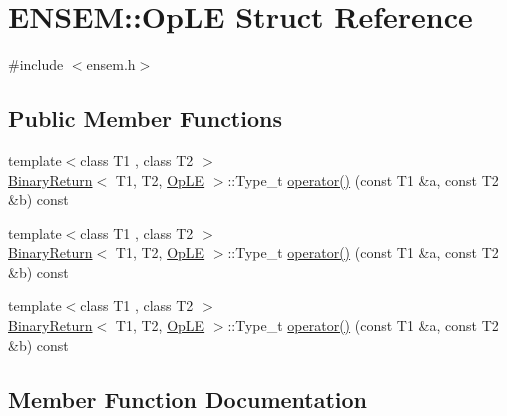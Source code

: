 \hypertarget{structENSEM_1_1OpLE}{}\section{E\+N\+S\+EM\+:\+:Op\+LE Struct Reference}
\label{structENSEM_1_1OpLE}


{\ttfamily \#include $<$ensem.\+h$>$}

\subsection*{Public Member Functions}
\begin{DoxyCompactItemize}
\item 
{\footnotesize template$<$class T1 , class T2 $>$ }\\\mbox{\hyperlink{structENSEM_1_1BinaryReturn}{Binary\+Return}}$<$ T1, T2, \mbox{\hyperlink{structENSEM_1_1OpLE}{Op\+LE}} $>$\+::Type\+\_\+t \mbox{\hyperlink{structENSEM_1_1OpLE_aecbfd8b265536bef6bc1dc2a124858ae}{operator()}} (const T1 \&a, const T2 \&b) const
\item 
{\footnotesize template$<$class T1 , class T2 $>$ }\\\mbox{\hyperlink{structENSEM_1_1BinaryReturn}{Binary\+Return}}$<$ T1, T2, \mbox{\hyperlink{structENSEM_1_1OpLE}{Op\+LE}} $>$\+::Type\+\_\+t \mbox{\hyperlink{structENSEM_1_1OpLE_aecbfd8b265536bef6bc1dc2a124858ae}{operator()}} (const T1 \&a, const T2 \&b) const
\item 
{\footnotesize template$<$class T1 , class T2 $>$ }\\\mbox{\hyperlink{structENSEM_1_1BinaryReturn}{Binary\+Return}}$<$ T1, T2, \mbox{\hyperlink{structENSEM_1_1OpLE}{Op\+LE}} $>$\+::Type\+\_\+t \mbox{\hyperlink{structENSEM_1_1OpLE_aecbfd8b265536bef6bc1dc2a124858ae}{operator()}} (const T1 \&a, const T2 \&b) const
\end{DoxyCompactItemize}


\subsection{Member Function Documentation}
\mbox{\label{structENSEM_1_1OpLE_aecbfd8b265536bef6bc1dc2a124858ae}} 
